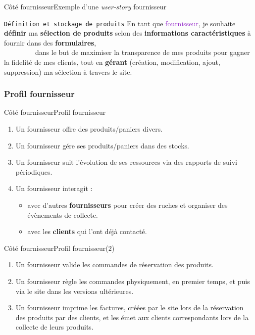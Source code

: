 \documentclass[usenames,dvipsnames]{beamer}
\begin{document}
\begin{frame}{Côté fournisseur}{Exemple d'une \textit{user-story} fournisseur}
\begin{block}{\textcolor{Sepia}{\texttt{Définition et stockage de produits}}}
En tant que \textcolor{DarkOrchid}{fournisseur}, je souhaite {\color{BrickRed} \textbf{définir} ma \textbf{sélection de produits} selon des \textbf{informations caractéristiques} à fournir dans des \textbf{formulaires}},\\
~~~~~~~~~dans le but de {\color{OliveGreen}maximiser la transparence de mes produits pour gagner la fidelité de mes clients, tout en \textbf{gérant} (création, modification, ajout, suppression) ma sélection à travers le site}.
\end{block}
\end{frame}

\subsubsection*{Profil fournisseur}
\begin{frame}{Côté fournisseur}{Profil fournisseur}
\begin{enumerate}
  \item Un fournisseur offre des produits/paniers divers.
  \item Un fournisseur gére ses produits/paniers dans des stocks.
  \item Un fournisseur suit l'évolution de ses ressources via des rapports de suivi périodiques.
  \item Un fournisseur interagit :
  \begin{itemize}
    \item avec d'autres \textbf{fournisseurs} pour créer des ruches et organiser des évènements de collecte.
    \item avec les \textbf{clients} qui l'ont déjà contacté.
  \end{itemize}
\end{enumerate}
\end{frame}

\begin{frame}{Côté fournisseur}{Profil fournisseur($2$)}
\begin{enumerate}
  \item Un fournisseur valide les commandes de réservation des produits.
  \item Un fournisseur règle les commandes physiquement, en premier temps, et puis via le site dans les versions ultérieures.
  \item Un fournisseur imprime les factures, créées par le site lors de la réservation des produits par des clients, et les émet aux clients correspondants lors de la collecte de leurs produits.
\end{enumerate}
\end{frame}
\end{document}
